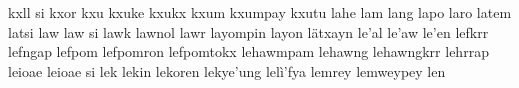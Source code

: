\documentclass[a4paper]{article}
\begin{document}
kxll si\hspace{2mm}
kxor\hspace{2mm}
kxu\hspace{2mm}
kxuke\hspace{2mm}
kxukx\hspace{2mm}
kxum\hspace{2mm}
kxumpay\hspace{2mm}
kxutu\hspace{2mm}
lahe\hspace{2mm}
lam\hspace{2mm}
lang\hspace{2mm}
lapo\hspace{2mm}
laro\hspace{2mm}
latem\hspace{2mm}
latsi\hspace{2mm}
law\hspace{2mm}
law si\hspace{2mm}
lawk\hspace{2mm}
lawnol\hspace{2mm}
lawr\hspace{2mm}
layompin\hspace{2mm}
layon\hspace{2mm}
lätxayn\hspace{2mm}
le'al\hspace{2mm}
le'aw\hspace{2mm}
le'en\hspace{2mm}
lefkrr\hspace{2mm}
lefngap\hspace{2mm}
lefpom\hspace{2mm}
lefpomron\hspace{2mm}
lefpomtokx\hspace{2mm}
lehawmpam\hspace{2mm}
lehawng\hspace{2mm}
lehawngkrr\hspace{2mm}
lehrrap\hspace{2mm}
leioae\hspace{2mm}
leioae si\hspace{2mm}
lek\hspace{2mm}
lekin\hspace{2mm}
lekoren\hspace{2mm}
lekye'ung\hspace{2mm}
lelì'fya\hspace{2mm}
lemrey\hspace{2mm}
lemweypey\hspace{2mm}
len\hspace{2mm}
\end{document}
